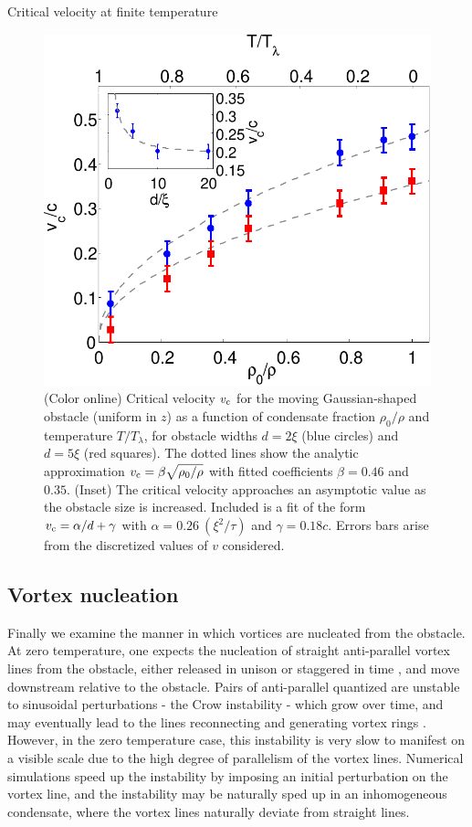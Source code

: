 \begin{chapter}{\label{cha:nonequib}Critical velocity at finite temperature}
\begin{figure}[h]
\centering
  \includegraphics[width=0.45\linewidth]{nonequib/figures/vc-n0}
  \caption{\label{fig:vc-n0}(Color online) Critical velocity $v_{\rm c}$ for the moving Gaussian-shaped obstacle (uniform in $z$) as a function of condensate fraction $\rho_0/\rho$ and temperature $T/T_\lambda$, for obstacle widths $d=2\xi$ (blue circles) and $d=5\xi$ (red squares). The dotted lines show the analytic approximation $v_{\rm c}=\beta \sqrt{\rho_0/\rho}$ with fitted coefficients $\beta=0.46$ and $0.35$. (Inset) The critical velocity approaches an asymptotic value as the obstacle size is increased. Included is a fit of the form $v_{\rm c}=\alpha/d+\gamma$ with $\alpha=0.26~(\xi^2/\tau)$ and $\gamma=0.18 c$.  Errors bars arise from the discretized values of $v$ considered.}
\end{figure}

\subsection{Vortex nucleation}

Finally we examine the manner in which vortices are nucleated from the obstacle.  At zero temperature, one expects the nucleation of straight anti-parallel vortex lines from the obstacle, either released in unison or staggered in time \cite{saito10,stagg_parker_14}, and move downstream relative to the obstacle.  Pairs of anti-parallel quantized are unstable to sinusoidal perturbations - the Crow instability - which grow over time, and may eventually lead to the lines reconnecting and generating vortex rings \cite{berloff_2001,simula_2011,zuccher}.  However, in the zero temperature case, this instability is very slow to manifest on a visible scale due to the high degree of parallelism of the vortex lines.  Numerical simulations speed up the instability by imposing an initial perturbation on the vortex line, and the instability may be naturally sped up in an inhomogeneous condensate, where the vortex lines naturally deviate from straight lines.


\end{chapter}
